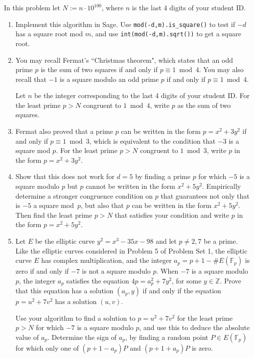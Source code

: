 \documentclass[11pt]{article}
\newcommand{\Fp}{\mathbb{F}_p}
\newcommand{\Z}{\mathbb{Z}}
\begin{document}
\medskip
\noindent
In this problem let $N:=n\cdot 10^{100}$, where $n$ is the last 4 digits of your student ID.

\begin{enumerate}[{\bf (a)}]
\item Implement this algorithm in Sage.  Use \texttt{mod(-d,m).is\_square()} to test if $-d$ has a square root mod $m$, and use \texttt{int(mod(-d,m).sqrt())} to get a square root.
\item You may recall Fermat's ``Christmas theorem", which states that an odd prime $p$ is the sum of two squares if and only if $p\equiv 1\bmod 4$.  You may also recall that $-1$ is a square modulo an odd prime $p$ if and only if $p\equiv 1\bmod 4$.

Let $n$ be the integer corresponding to the last 4 digits of your student ID.
For the least prime $p > N$ congruent to $1\bmod 4$, write $p$ as the sum of two squares.

\item Fermat also proved that a prime $p$ can be written in the form $p=x^2+3y^2$ if and only if $p\equiv 1\bmod 3$, which is equivalent to the condition that $-3$ is a square mod $p$.  For the least prime $p > N$ congruent to $1\bmod 3$, write $p$ in the form $p=x^2+3y^2$.

\item Show that this does not work for $d=5$ by finding a prime $p$ for which $-5$ is a square modulo $p$ but $p$ cannot be written in the form $x^2+5y^2$.  Empirically determine a stronger congruence condition on $p$ that guarantees not only that is $-5$ a square mod~$p$, but also that $p$ can be written in the form $x^2+5y^2$.
Then find the least prime $p >N$ that satisfies your condition and write $p$ in the form $p=x^2+5y^2$.

\item Let $E$ be the elliptic curve $y^2=x^3-35x-98$ and let $p\ne 2,7$ be a prime.  Like the elliptic curves considered in Problem 5 of Problem Set 1, the elliptic curve $E$ has complex multiplication, and the integer $a_p=p+1-\#E(\Fp)$ is zero if and only if $-7$ is not a square modulo $p$.
When $-7$ is a square modulo $p$, the integer $a_p$ satisfies the equation $4p=a_p^2+7y^2$, for some $y\in\Z$.
Prove that this equation has a solution $(a_p,y)$ if and only if the equation $p=u^2+7v^2$ has a solution $(u,v)$.

Use your algorithm to find a solution to $p=u^2+7v^2$ for the least prime $p>N$ for which $-7$ is a square modulo $p$,
and use this to deduce the absolute value of $a_p$.
Determine the sign of $a_p$, by finding a random point $P\in E(\Fp)$ for which only one of $(p+1-a_p)P$ and $(p+1+a_p)P$ is zero.

\end{enumerate}
\end{document}
